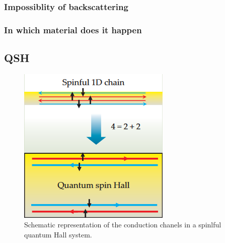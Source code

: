 \subsubsection{Impossiblity of backscattering}

\subsubsection{In which material does it happen}

\subsection{QSH}

\begin{figure}[h!]
    \includegraphics[scale = 0.7]{sections/visuel/spinful.png}
    \caption{Schematic representation of the conduction chanels in a spinlful quantum Hall system.}
    \label{spinful}
\end{figure}

